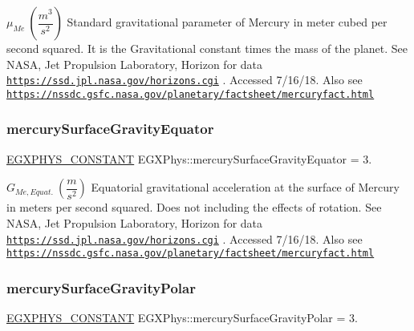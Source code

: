$ \mu_{Me} \ (\dfrac{m^3}{s^2})$ Standard gravitational parameter of Mercury in meter cubed per second squared. It is the Gravitational constant times the mass of the planet. See N\+A\+SA, Jet Propulsion Laboratory, Horizon for data \href{https://ssd.jpl.nasa.gov/horizons.cgi}{\tt https\+://ssd.\+jpl.\+nasa.\+gov/horizons.\+cgi} . Accessed 7/16/18. Also see \href{https://nssdc.gsfc.nasa.gov/planetary/factsheet/mercuryfact.html}{\tt https\+://nssdc.\+gsfc.\+nasa.\+gov/planetary/factsheet/mercuryfact.\+html} \mbox{\label{group___e_g_x_phys-_constants-_astrophysics-_solar_system-_mercury-_bulk_ga82c6a427ba4ba310574c522cff333693}} 
\subsubsection{\texorpdfstring{mercury\+Surface\+Gravity\+Equator}{mercurySurfaceGravityEquator}}
{\footnotesize\ttfamily \mbox{\hyperlink{group___e_g_x_phys-_constants-_macros_ga76980d288494ce1714c9ac68a95ba702}{E\+G\+X\+P\+H\+Y\+S\+\_\+\+C\+O\+N\+S\+T\+A\+NT}} E\+G\+X\+Phys\+::mercury\+Surface\+Gravity\+Equator = 3.}

$ G_{Me,Equat.} \ (\dfrac{m}{s^2})$ Equatorial gravitational acceleration at the surface of Mercury in meters per second squared. Does not including the effects of rotation. See N\+A\+SA, Jet Propulsion Laboratory, Horizon for data \href{https://ssd.jpl.nasa.gov/horizons.cgi}{\tt https\+://ssd.\+jpl.\+nasa.\+gov/horizons.\+cgi} . Accessed 7/16/18. Also see \href{https://nssdc.gsfc.nasa.gov/planetary/factsheet/mercuryfact.html}{\tt https\+://nssdc.\+gsfc.\+nasa.\+gov/planetary/factsheet/mercuryfact.\+html} \mbox{\label{group___e_g_x_phys-_constants-_astrophysics-_solar_system-_mercury-_bulk_ga7fdbe2d882ff39cc6151ed1c9afb93f7}} 
\subsubsection{\texorpdfstring{mercury\+Surface\+Gravity\+Polar}{mercurySurfaceGravityPolar}}
{\footnotesize\ttfamily \mbox{\hyperlink{group___e_g_x_phys-_constants-_macros_ga76980d288494ce1714c9ac68a95ba702}{E\+G\+X\+P\+H\+Y\+S\+\_\+\+C\+O\+N\+S\+T\+A\+NT}} E\+G\+X\+Phys\+::mercury\+Surface\+Gravity\+Polar = 3.}

